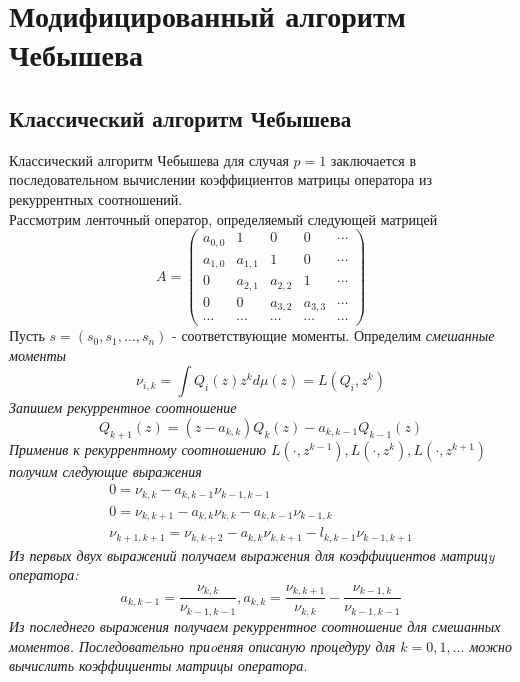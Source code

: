 \section{Модифицированный алгоритм Чебышева}
\subsection{Классический алгоритм Чебышева}
Классический алгоритм Чебышева для случая $p=1$ заключается в
последовательном вычислении коэффициентов матрицы оператора из
рекуррентных соотношений. \\
Рассмотрим ленточный оператор, определяемый следующей матрицей
$$
A=\left(
\begin{array}{ccccccccccccc}
a_{0,0} & 1 & 0 & 0 & \cdots \\
a_{1,0} & a_{1,1} & 1 & 0 & \cdots \\
0 & a_{2,1} & a_{2,2} & 1 & \cdots \\
0 & 0 & a_{3,2} & a_{3,3} & \cdots \\
\cdots & \cdots & \cdots & \cdots & \cdots
\end{array}
\right)
$$
Пусть $s=(s_0, s_1, \ldots, s_n)$ - соответствующие моменты.
Определим \it смешанные моменты \rm
$$
\nu_{i,k}=\int {Q_i(z)z^kd\mu(z)=L(Q_{i},z^k)}
$$
Запишем рекуррентное соотношение
$$
Q_{k+1}(z)=(z-a_{k,k})Q_k(z)-a_{k,k-1}Q_{k-1}(z)
$$
Применив к рекуррентному соотношению $L(\cdot, z^{k-1}), L(\cdot,
z^k), L(\cdot, z^{k+1}) $ получим следующие выражения
\begin{eqnarray}
0=\nu_{k,k}-a_{k,k-1}\nu_{k-1,k-1} \nonumber \\
0=\nu_{k,k+1}-a_{k,k}\nu_{k,k}-a_{k,k-1}\nu_{k-1,k} \nonumber \\
\nu_{k+1,k+1}=\nu_{k,k+2}-a_{k,k}\nu_{k,k+1}-l_{k,k-1}\nu_{k-1,k+1}
\nonumber
\end{eqnarray}
Из первых двух выражений получаем выражения для коэффициентов
матрицy оператора:
\begin{equation}
a_{k,k-1}=\frac{\nu_{k,k}}{\nu_{k-1,k-1}},
a_{k,k}=\frac{\nu_{k,k+1}}{\nu_{k,k}}-\frac{\nu_{k-1,k}}{\nu_{k-1,k-1}}
\end{equation}
Из последнего выражения получаем рекуррентное соотношение для
смешанных моментов. Последовательно приoеняя описаную процедуру
для $k=0,1, \ldots$ можно вычислить коэффициенты матрицы
оператора.
